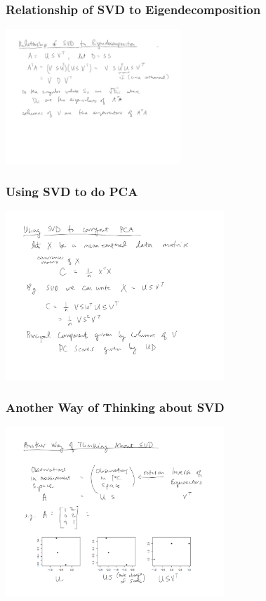 \documentclass{beamer}
\begin{document}
\begin{frame}
  \frametitle{Relationship of SVD to Eigendecomposition}

\begin{center}
\includegraphics[height=2in]{svd-reln-eigen}
\end{center}

\end{frame}

\begin{frame}
  \frametitle{Using SVD to do PCA}

\begin{center}
\includegraphics[height=2.5in]{svd-pca}
\end{center}

\end{frame}

\begin{frame}
  \frametitle{Another Way of Thinking about SVD}


\begin{center}
\includegraphics[height=2.5in]{svd-another-view}
\end{center}

\end{frame}
\end{document}
